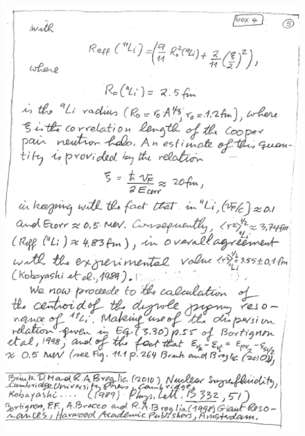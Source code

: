 \documentclass[a4paper,11pt]{book}
\numberwithin{equation}{section}
\numberwithin{figure}{section}
\numberwithin{table}{section}
\begin{document}
\begin{figure}
\centerline{\includegraphics*[width=\textwidth,angle=0]{figs/box4_7.pdf}}
\end{figure}
\end{document}
